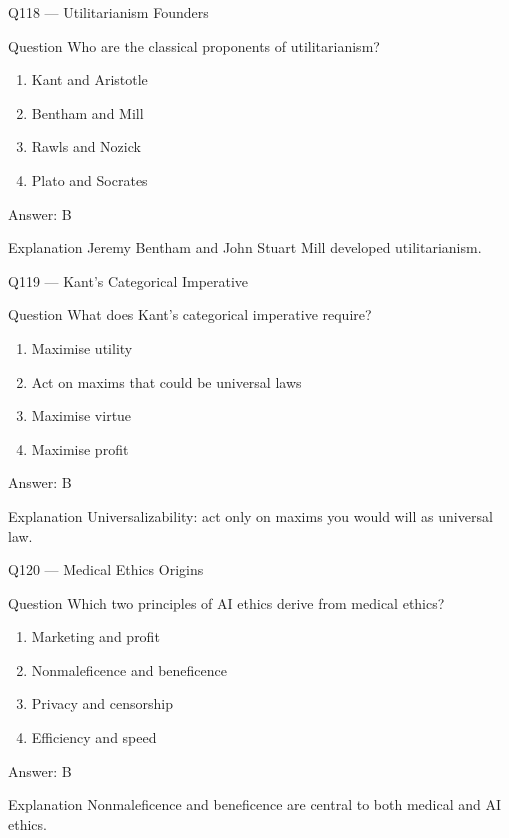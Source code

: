 \documentclass[aspectratio=169,8pt]{beamer}
\begin{document}
	\begin{frame}{Q118 --- Utilitarianism Founders}
		\begin{block}{Question}
			Who are the classical proponents of utilitarianism?
		\end{block}
		\begin{enumerate}
			\item Kant and Aristotle
			\item Bentham and Mill
			\item Rawls and Nozick
			\item Plato and Socrates
		\end{enumerate}
		\begin{exampleblock}{Answer: B}\end{exampleblock}
		\begin{block}{Explanation}
			Jeremy Bentham and John Stuart Mill developed utilitarianism.
		\end{block}
	\end{frame}
	
	\begin{frame}{Q119 --- Kant's Categorical Imperative}
		\begin{block}{Question}
			What does Kant's categorical imperative require?
		\end{block}
		\begin{enumerate}
			\item Maximise utility
			\item Act on maxims that could be universal laws
			\item Maximise virtue
			\item Maximise profit
		\end{enumerate}
		\begin{exampleblock}{Answer: B}\end{exampleblock}
		\begin{block}{Explanation}
			Universalizability: act only on maxims you would will as universal law.
		\end{block}
	\end{frame}
	
	\begin{frame}{Q120 --- Medical Ethics Origins}
		\begin{block}{Question}
			Which two principles of AI ethics derive from medical ethics?
		\end{block}
		\begin{enumerate}
			\item Marketing and profit
			\item Nonmaleficence and beneficence
			\item Privacy and censorship
			\item Efficiency and speed
		\end{enumerate}
		\begin{exampleblock}{Answer: B}\end{exampleblock}
		\begin{block}{Explanation}
			Nonmaleficence and beneficence are central to both medical and AI ethics.
		\end{block}
	\end{frame}
	
\end{document}
